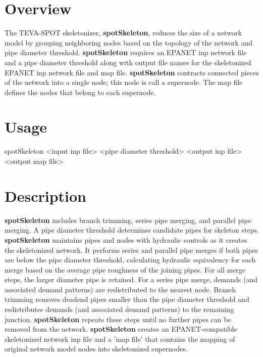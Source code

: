 \section{Overview}\label{skelExecutable_skelOverview}
The TEVA-SPOT skeletonizer, {\bfseries spotSkeleton}, reduces the size of a network  model by grouping neighboring nodes based on the topology of the network and pipe diameter threshold.  {\bfseries spotSkeleton} requires an EPANET inp network file and a pipe diameter threshold along with output file names for the skeletonized EPANET inp network file and map file.  {\bfseries spotSkeleton} contracts connected pieces of the network into a single node; this node is call a supernode.  The map file defines the nodes that belong to each supernode.

\section{Usage}\label{skelExecutable_skelUsage}
\begin{verb}
   spotSkeleton <input inp file> <pipe diameter threshold> <output inp file> <output map file>
\end{verb}

\section{Description}\label{skelExecutable_skelDescription}
{\bfseries spotSkeleton} includes branch trimming, series pipe merging, and parallel pipe merging.  A pipe diameter threshold determines candidate pipes for skeleton steps.  {\bfseries spotSkeleton} maintains pipes and nodes with hydraulic controls as it creates the skeletonized network.  It performs series and parallel pipe merges if both pipes are below the pipe diameter threshold, calculating hydraulic equivalency for each merge based on the average pipe roughness of the joining pipes.  For all merge steps, the larger diameter pipe is retained.  For a series pipe merge, demands (and associated demand patterns) are redistributed to the nearest node.   Branch trimming removes deadend pipes smaller than the pipe diameter threshold and redistributes demands (and associated demand patterns) to the remaining junction.  {\bfseries spotSkeleton} repeats these steps until no further pipes can be removed from the network.   {\bfseries spotSkeleton} creates an EPANET-compatible skeletonized network inp file and a 'map file' that contains the mapping of original network model nodes into skeletonized supernodes. 

